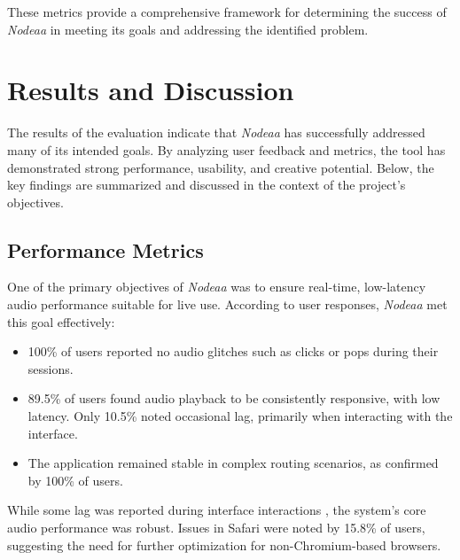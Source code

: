 \documentclass[10pt,twocolumn]{article}
\begin{document}
These metrics provide a comprehensive framework for determining the success of \textit{Nodeaa} in meeting its goals and addressing the identified problem.

\section{Results and Discussion}

The results of the evaluation indicate that \textit{Nodeaa} has successfully addressed many of its intended goals. By analyzing user feedback and metrics, the tool has demonstrated strong performance, usability, and creative potential. Below, the key findings are summarized and discussed in the context of the project’s objectives.

\subsection{Performance Metrics}
One of the primary objectives of \textit{Nodeaa} was to ensure real-time, low-latency audio performance suitable for live use. According to user responses, \textit{Nodeaa} met this goal effectively:
\begin{itemize}
    \item 100\% of users reported no audio glitches such as clicks or pops during their sessions.
    \item 89.5\% of users found audio playback to be consistently responsive, with low latency. Only 10.5\% noted occasional lag, primarily when interacting with the interface.
    \item The application remained stable in complex routing scenarios, as confirmed by 100\% of users.
\end{itemize}
While some lag was reported during interface interactions \cite{chkec2019performance}, the system’s core audio performance was robust. Issues in Safari were noted by 15.8\% of users, suggesting the need for further optimization for non-Chromium-based browsers.
\end{document}
